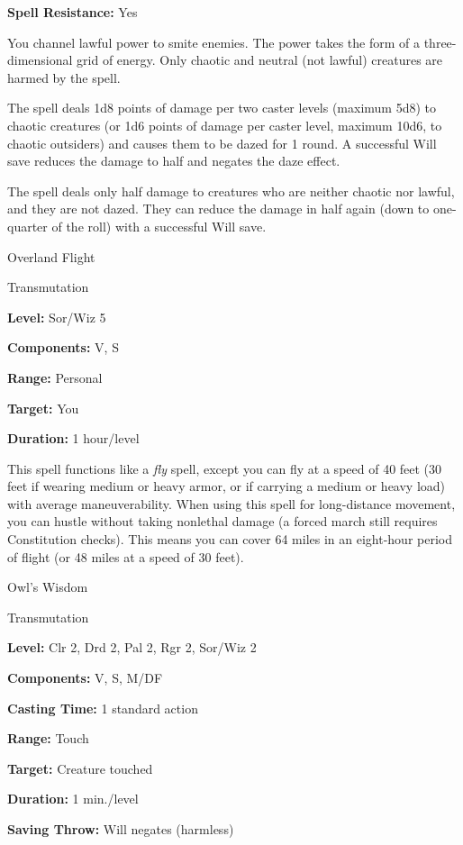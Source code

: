 \documentclass{article}
\begin{document}
\textbf{Spell Resistance:} Yes

You channel lawful power to smite enemies. The power takes the form of a three-dimensional 
grid of energy. Only chaotic and neutral (not lawful) creatures are harmed by the 
spell.

The spell deals 1d8 points of damage per two caster levels (maximum 5d8) to chaotic 
creatures (or 1d6 points of damage per caster level, maximum 10d6, to chaotic outsiders) 
and causes them to be dazed for 1 round. A successful Will save reduces the damage 
to half and negates the daze effect.

The spell deals only half damage to creatures who are neither chaotic nor lawful, 
and they are not dazed. They can reduce the damage in half again (down to one-quarter 
of the roll) with a successful Will save.

\vspace{12pt}
Overland Flight

Transmutation

\textbf{Level:} Sor/Wiz 5

\textbf{Components:} V, S

\textbf{Range:} Personal

\textbf{Target:} You

\textbf{Duration:} 1 hour/level

This spell functions like a \textit{fly }spell, except you can fly at a speed of 
40 feet (30 feet if wearing medium or heavy armor, or if carrying a medium or heavy 
load) with average maneuverability. When using this spell for long-distance movement, 
you can hustle without taking nonlethal damage (a forced march still requires Constitution 
checks). This means you can cover 64 miles in an eight-hour period of flight (or 
48 miles at a speed of 30 feet).

\vspace{12pt}
Owl's Wisdom

Transmutation

\textbf{Level:} Clr 2, Drd 2, Pal 2, Rgr 2, Sor/Wiz 2

\textbf{Components:} V, S, M/DF

\textbf{Casting Time:} 1 standard action

\textbf{Range:} Touch

\textbf{Target:} Creature touched

\textbf{Duration:} 1 min./level

\textbf{Saving Throw: }Will negates (harmless)
\end{document}
